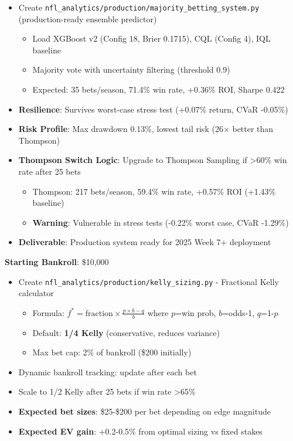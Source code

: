 \begin{itemize}
  \item {} Create \texttt{nfl\_analytics/production/majority\_betting\_system.py} (production-ready ensemble predictor)
  \begin{itemize}
    \item Load XGBoost v2 (Config 18, Brier 0.1715), CQL (Config 4), IQL baseline
    \item Majority vote with uncertainty filtering (threshold 0.9)
    \item Expected: 35 bets/season, 71.4\% win rate, +0.36\% ROI, Sharpe 0.422
  \end{itemize}
  \item {} \textbf{Resilience}: Survives worst-case stress test (+0.07\% return, CVaR -0.05\%)
  \item {} \textbf{Risk Profile}: Max drawdown 0.13\%, lowest tail risk (26$\times$ better than Thompson)
  \item {} \textbf{Thompson Switch Logic}: Upgrade to Thompson Sampling if >60\% win rate after 25 bets
  \begin{itemize}
    \item Thompson: 217 bets/season, 59.4\% win rate, +0.57\% ROI (+1.43\% baseline)
    \item \textbf{Warning}: Vulnerable in stress tests (-0.22\% worst case, CVaR -1.29\%)
  \end{itemize}
  \item \textbf{Deliverable}: Production system ready for 2025 Week 7+ deployment
\end{itemize}

\textbf{Starting Bankroll}: \$10,000

\begin{itemize}
  \item {} Create \texttt{nfl\_analytics/production/kelly\_sizing.py} - Fractional Kelly calculator
  \begin{itemize}
    \item Formula: $f^* = \text{fraction} \times \frac{p \times b - q}{b}$ where $p$=win prob, $b$=odds-1, $q$=1-$p$
    \item Default: \textbf{1/4 Kelly} (conservative, reduces variance)
    \item Max bet cap: 2\% of bankroll (\$200 initially)
  \end{itemize}
  \item {} Dynamic bankroll tracking: update after each bet
  \item {} Scale to 1/2 Kelly after 25 bets if win rate >65\%
  \item \textbf{Expected bet sizes}: \$25-\$200 per bet depending on edge magnitude
  \item \textbf{Expected EV gain}: +0.2-0.5\% from optimal sizing vs fixed stakes
\end{itemize}

